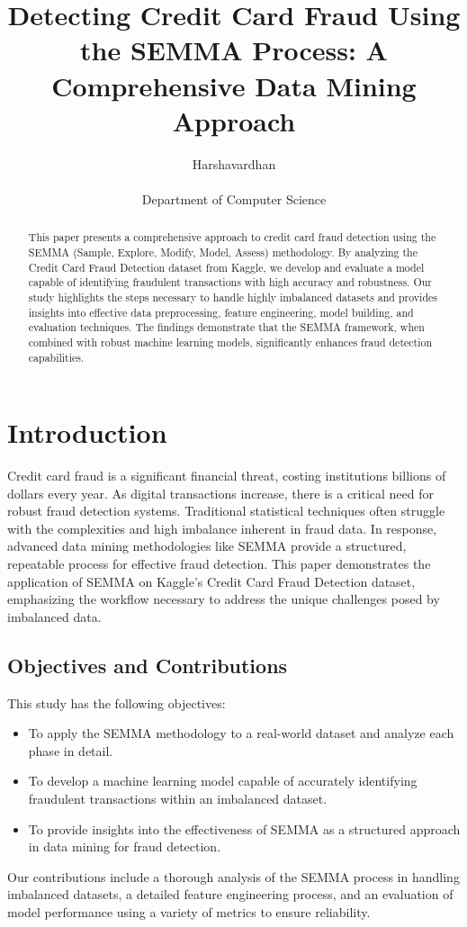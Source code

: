 \documentclass{article} %
\title{Detecting Credit Card Fraud Using the SEMMA Process: A Comprehensive Data Mining Approach}
\author{Harshavardhan \\ 
    \\
    Department of Computer Science
}
\date{} %
\begin{document}
\maketitle

\begin{abstract}
This paper presents a comprehensive approach to credit card fraud detection using the SEMMA (Sample, Explore, Modify, Model, Assess) methodology. By analyzing the Credit Card Fraud Detection dataset from Kaggle, we develop and evaluate a model capable of identifying fraudulent transactions with high accuracy and robustness. Our study highlights the steps necessary to handle highly imbalanced datasets and provides insights into effective data preprocessing, feature engineering, model building, and evaluation techniques. The findings demonstrate that the SEMMA framework, when combined with robust machine learning models, significantly enhances fraud detection capabilities.
\end{abstract}

\section{Introduction}
Credit card fraud is a significant financial threat, costing institutions billions of dollars every year. As digital transactions increase, there is a critical need for robust fraud detection systems. Traditional statistical techniques often struggle with the complexities and high imbalance inherent in fraud data. In response, advanced data mining methodologies like SEMMA provide a structured, repeatable process for effective fraud detection. This paper demonstrates the application of SEMMA on Kaggle's Credit Card Fraud Detection dataset, emphasizing the workflow necessary to address the unique challenges posed by imbalanced data.

\subsection{Objectives and Contributions}
This study has the following objectives:
\begin{itemize}
    \item To apply the SEMMA methodology to a real-world dataset and analyze each phase in detail.
    \item To develop a machine learning model capable of accurately identifying fraudulent transactions within an imbalanced dataset.
    \item To provide insights into the effectiveness of SEMMA as a structured approach in data mining for fraud detection.
\end{itemize}
Our contributions include a thorough analysis of the SEMMA process in handling imbalanced datasets, a detailed feature engineering process, and an evaluation of model performance using a variety of metrics to ensure reliability.
\end{document}
